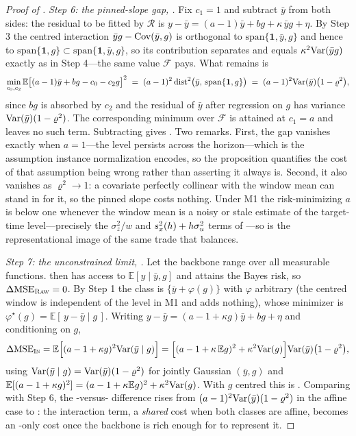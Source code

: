 \begin{proof}[Proof of ]
\emph{Step 6: the pinned-slope gap, .}
Fix $c_1 = 1$ and subtract $\bar y$ from both sides: the residual to be fitted by
$\mathcal{R}$ is $y - \bar y = (a-1)\bar y + b g + \kappa\, \bar y g + \eta$. By Step 3 the
centred interaction $\bar y g - \mathrm{Cov}(\bar y, g)$ is orthogonal to
$\mathrm{span}\{\mathbf 1, \bar y, g\}$ and hence to
$\mathrm{span}\{\mathbf 1, g\} \subset \mathrm{span}\{\mathbf 1, \bar y, g\}$, so its
contribution separates and equals $\kappa^2 \mathrm{Var}(\bar y g)$ exactly as in Step 4---the same
value $\mathcal{F}$ pays. What remains is
\begin{equation}
  \min_{c_0, c_2} \mathbb{E}\big[(a-1)\bar y + b g - c_0 - c_2 g\big]^2
  \;=\; (a-1)^2 \, \mathrm{dist}^2\big(\bar y,\, \mathrm{span}\{\mathbf 1, g\}\big)
  \;=\; (a-1)^2 \mathrm{Var}(\bar y)\big(1 - \varrho^2\big),
\end{equation}
since $b g$ is absorbed by $c_2$ and the residual of $\bar y$ after regression on $g$ has
variance $\mathrm{Var}(\bar y)(1-\varrho^2)$. The corresponding minimum over $\mathcal{F}$ is
attained at $c_1 = a$ and leaves no such term. Subtracting gives . Two
remarks. First, the gap vanishes exactly when $a = 1$---the level persists across the
horizon---which is the assumption instance normalization encodes, so the proposition
quantifies the cost of that assumption being wrong rather than asserting it always is.
Second, it also vanishes as $\varrho^2 \to 1$: a covariate perfectly collinear with the
window mean can stand in for it, so the pinned slope costs nothing. Under M1 the
risk-minimizing $a$ is below one whenever the window mean is a noisy or stale estimate of
the target-time level---precisely the $\sigma_z^2/w$ and $s_x^2(h) + h\sigma_u^2$ terms of
---so  is the representational image of the same trade
that  balances.

\emph{Step 7: the unconstrained limit, .}
Let the backbone range over all measurable functions. \rawm{} then has access to
$\mathbb{E}[y \mid \bar y, g]$ and attains the Bayes risk, so $\Delta\mathrm{MSE}_{\textsc{Raw}} = 0$.
By Step 1 the \inm{} class is $\{\bar y + \varphi(g)\}$ with $\varphi$ arbitrary (the
centred window is independent of the level in M1 and adds nothing), whose minimizer is
$\varphi^\star(g) = \mathbb{E}[\,y - \bar y \mid g\,]$. Writing
$y - \bar y = (a - 1 + \kappa g)\bar y + b g + \eta$ and conditioning on $g$,
\begin{equation}
  \Delta\mathrm{MSE}_{\textsc{In}}
  = \mathbb{E}\Bigl[(a-1+\kappa g)^2 \mathrm{Var}(\bar y \mid g)\Bigr]
  = \Bigl[(a-1+\kappa\,\mathbb{E} g)^2 + \kappa^2\mathrm{Var}(g)\Bigr]\mathrm{Var}(\bar y)\bigl(1-\varrho^2\bigr),
\end{equation}
using $\mathrm{Var}(\bar y \mid g) = \mathrm{Var}(\bar y)(1-\varrho^2)$ for jointly Gaussian $(\bar y, g)$
and $\mathbb{E}[(a-1+\kappa g)^2] = (a-1+\kappa \mathbb{E} g)^2 + \kappa^2\mathrm{Var}(g)$. With
$g$ centred this is . Comparing with Step 6, the \inm-versus-\rawm{}
difference rises from $(a-1)^2\mathrm{Var}(\bar y)(1-\varrho^2)$ in the affine case to
: the interaction term, a \emph{shared} cost when both classes are affine,
becomes an \inm-only cost once the backbone is rich enough for \rawm{} to represent it.


\end{proof}

